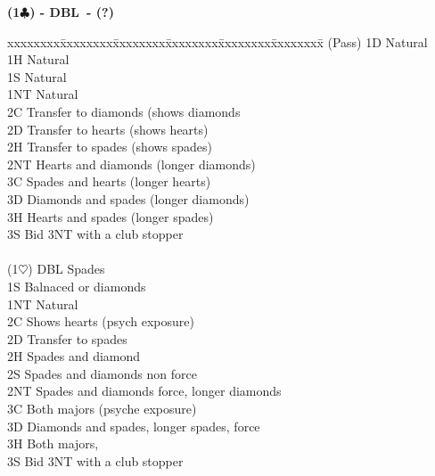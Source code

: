 \documentclass[10pt]{article}
\renewcommand{\c}{$\clubsuit$}
\newcommand{\h}{$\heartsuit$}
\newcommand{\x}{DBL}
\newenvironment{bidtable}[1][]
{\textbf{#1}
  \begin{adjustwidth}{1em}{}
    \addvspace{2pt}
    \begin{tabbing}
      xxxxxxxx\=xxxxxxxx\=xxxxxxxx\=xxxxxxxx\=xxxxxxxx\=xxxxxxxx\=\kill}
{\end{tabbing}\end{adjustwidth}\bigskip}%
\begin{document}
\begin{multicols*}{2}
\begin{bidtable}[(1\c) - \x\ - (?)]
(Pass) \> 1D    \> Natural                                    \\
       \> 1H    \> Natural                                    \\
       \> 1S    \> Natural                                    \\
       \> 1NT   \> Natural                                    \\
       \> 2C    \> Transfer to diamonds (shows diamonds       \\
       \> 2D    \> Transfer to hearts (shows hearts)          \\
       \> 2H    \> Transfer to spades (shows spades)          \\
       \> 2NT   \> Hearts and diamonds (longer diamonds)      \\
       \> 3C    \> Spades and hearts (longer hearts)          \\
       \> 3D    \> Diamonds and spades (longer diamonds)      \\
       \> 3H    \> Hearts and spades (longer spades)          \\
       \> 3S    \> Bid 3NT with a club stopper                \\
                                                              \\
(1\h)  \> DBL   \> Spades                                     \\
       \> 1S    \> Balnaced or diamonds                       \\
       \> 1NT   \> Natural                                    \\
       \> 2C    \> Shows hearts (psych exposure)              \\
       \> 2D    \> Transfer to spades                         \\
       \> 2H    \> Spades and diamond                         \\
       \> 2S    \> Spades and diamonds non force              \\
       \> 2NT   \> Spades and diamonds force, longer diamonds \\
       \> 3C    \> Both majors (psyche exposure)              \\
       \> 3D    \> Diamonds and spades, longer spades, force  \\
       \> 3H    \> Both majors,                               \\
       \> 3S    \> Bid 3NT with a club stopper                \\

\end{bidtable}
\end{multicols*}
\end{document}
